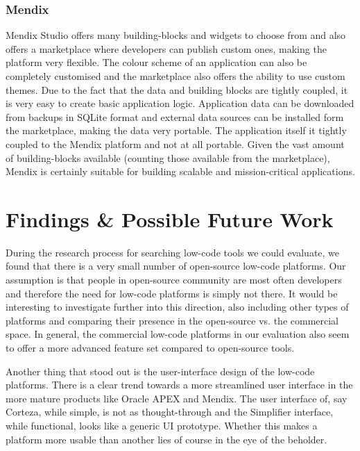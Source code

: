\documentclass[runningheads]{llncs}
\begin{document}
\subsubsection{Mendix}

Mendix Studio offers many building-blocks and widgets to choose from and also offers a marketplace where developers can publish custom ones, making the platform very flexible. The colour scheme of an application can also be completely customised and the marketplace also offers the ability to use custom themes. Due to the fact that the data and building blocks are tightly coupled, it is very easy to create basic application logic. Application data can be downloaded from backups in SQLite format and external data sources can be installed form the marketplace, making the data very portable. The application itself it tightly coupled to the Mendix platform and not at all portable. Given the vast amount of building-blocks available (counting those available from the marketplace), Mendix is certainly suitable for building scalable and mission-critical applications.

\section{Findings \& Possible Future Work}
\label{sec:findings}

During the research process for searching low-code tools we could evaluate, we found that there is a very small number of open-source low-code platforms. Our assumption is that people in open-source community are most often developers and therefore the need for low-code platforms is simply not there. It would be interesting to investigate further into this direction, also including other types of platforms and comparing their presence in the open-source vs. the commercial space. In general, the commercial low-code platforms in our evaluation also seem to offer a more advanced feature set compared to open-source tools.

Another thing that stood out is the user-interface design of the low-code platforms. There is a clear trend towards a more streamlined user interface in the more mature products like Oracle APEX and Mendix. The user interface of, say Corteza, while simple, is not as thought-through and the Simplifier interface, while functional, looks like a generic UI prototype. Whether this makes a platform more usable than another lies of course in the eye of the beholder.

\end{document}
